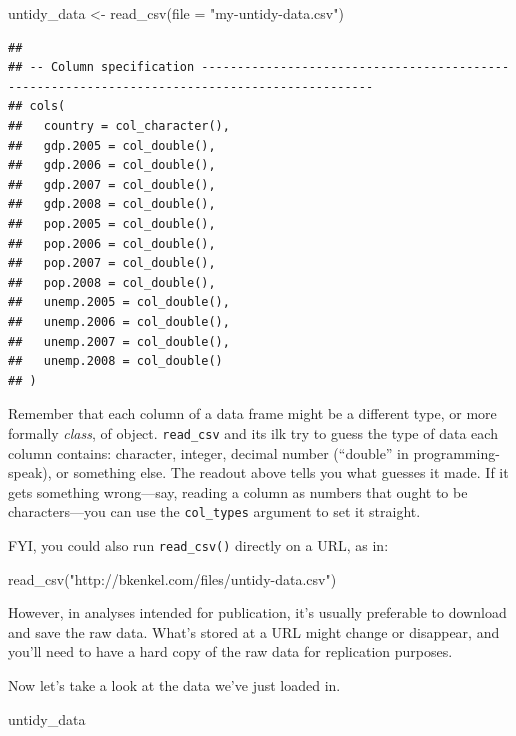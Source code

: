 \documentclass[
  12pt,
  oneside,openany]{book}
\newenvironment{Shaded}{\begin{snugshade}}{\end{snugshade}}
\newcommand{\AttributeTok}[1]{\textcolor[rgb]{0.77,0.63,0.00}{#1}}
\newcommand{\FunctionTok}[1]{\textcolor[rgb]{0.00,0.00,0.00}{#1}}
\newcommand{\NormalTok}[1]{#1}
\newcommand{\OtherTok}[1]{\textcolor[rgb]{0.56,0.35,0.01}{#1}}
\newcommand{\StringTok}[1]{\textcolor[rgb]{0.31,0.60,0.02}{#1}}
\begin{document}
\begin{Shaded}
\begin{Highlighting}[]
\NormalTok{untidy\_data }\OtherTok{\textless{}{-}} \FunctionTok{read\_csv}\NormalTok{(}\AttributeTok{file =} \StringTok{"my{-}untidy{-}data.csv"}\NormalTok{)}
\end{Highlighting}
\end{Shaded}

\begin{verbatim}
## 
## -- Column specification ----------------------------------------------------------------------------------------------
## cols(
##   country = col_character(),
##   gdp.2005 = col_double(),
##   gdp.2006 = col_double(),
##   gdp.2007 = col_double(),
##   gdp.2008 = col_double(),
##   pop.2005 = col_double(),
##   pop.2006 = col_double(),
##   pop.2007 = col_double(),
##   pop.2008 = col_double(),
##   unemp.2005 = col_double(),
##   unemp.2006 = col_double(),
##   unemp.2007 = col_double(),
##   unemp.2008 = col_double()
## )
\end{verbatim}

Remember that each column of a data frame might be a different type, or more formally \emph{class}, of object. \texttt{read\_csv} and its ilk try to guess the type of data each column contains: character, integer, decimal number (``double'' in programming-speak), or something else. The readout above tells you what guesses it made. If it gets something wrong---say, reading a column as numbers that ought to be characters---you can use the \texttt{col\_types} argument to set it straight.

FYI, you could also run \texttt{read\_csv()} directly on a URL, as in:

\begin{Shaded}
\begin{Highlighting}[]
\FunctionTok{read\_csv}\NormalTok{(}\StringTok{"http://bkenkel.com/files/untidy{-}data.csv"}\NormalTok{)}
\end{Highlighting}
\end{Shaded}

However, in analyses intended for publication, it's usually preferable to download and save the raw data. What's stored at a URL might change or disappear, and you'll need to have a hard copy of the raw data for replication purposes.

Now let's take a look at the data we've just loaded in.

\begin{Shaded}
\begin{Highlighting}[]
\NormalTok{untidy\_data}
\end{Highlighting}
\end{Shaded}
\end{document}
